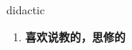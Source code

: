 
\begin{frame}
{\huge didactic}
\begin{center}
\begin{enumerate}\Large
  \item \textbf{喜欢说教的，思修的}
\end{enumerate}
\end{center}
\end{frame}
